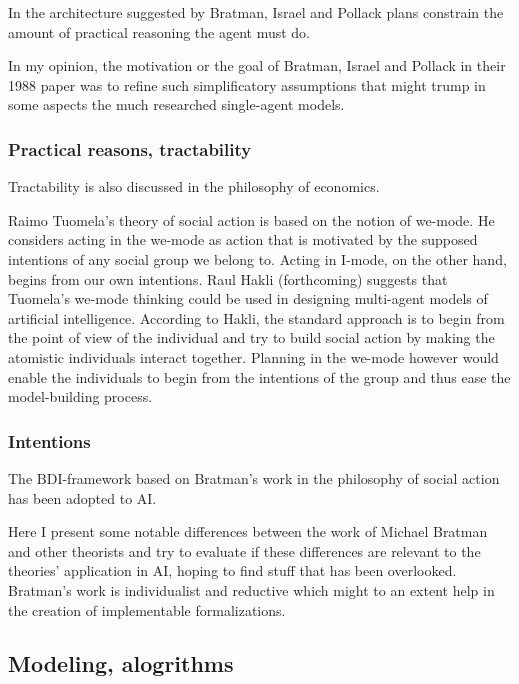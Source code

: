 In the architecture suggested by Bratman, Israel and Pollack \citeyearpar{bratman_plans_1988} plans constrain the amount of practical reasoning the agent must do.

In my opinion, the motivation or the goal of Bratman, Israel and Pollack in their 1988 paper was to refine such simplificatory assumptions that might trump in some aspects the much researched single-agent models.

\subsubsection{Practical reasons, tractability}
Tractability is also discussed in the  philosophy of economics.

Raimo Tuomela's theory of social action is based on the notion of we-mode. He considers acting in the we-mode as action that is motivated by the supposed intentions of any social group we belong to. Acting in I-mode, on the other hand, begins from our own intentions. Raul Hakli (forthcoming) suggests that Tuomela's we-mode thinking could be used in designing multi-agent models of artificial intelligence. According to Hakli, the standard approach is to begin from the point of view of the individual and try to build social action by making the atomistic individuals interact together. Planning in the we-mode however would enable the individuals to begin from the intentions of the group and thus ease the model-building process.

\subsubsection{Intentions}

The BDI-framework based on Bratman's work in the philosophy of social action has been adopted to AI.

Here I present some notable differences between the work of Michael Bratman and other theorists and try to evaluate if these differences are relevant to the theories' application in AI, hoping to find stuff that has been overlooked. Bratman's work is individualist and reductive which might to an extent help in the creation of implementable formalizations.

\subsection{Modeling, alogrithms}




